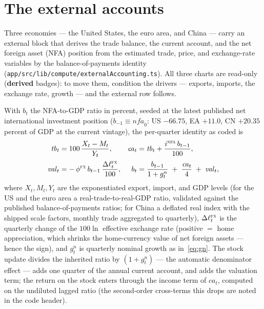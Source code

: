 \documentclass[11pt]{article}
\newcommand{\ui}[1]{\textbf{#1}}
\theoremstyle{plain}
\theoremstyle{remark}
\begin{document}
\section{The external accounts}\label{sec:external}

Three economies --- the United States, the euro area, and China ---
carry an external block that derives the trade balance, the current
account, and the net foreign asset (NFA) position from the estimated
trade, price, and exchange-rate variables by the balance-of-payments
identity (\texttt{app/src/lib/compute/externalAccounting.ts}). All
three charts are read-only (\ui{derived} badges): to move them,
condition the drivers --- exports, imports, the exchange rate, growth
--- and the external row follows.

With $b_t$ the NFA-to-GDP ratio in percent, seeded at the latest
published net international investment position ($b_{-1} \equiv
\mathit{nfa}_0$: US $-66.75$, EA $+11.0$, CN $+20.35$ percent of GDP at
the current vintage), the per-quarter identity as coded is
\begin{align}
  \mathit{tb}_t &= 100\,\frac{X_t - M_t}{Y_t},
  &\mathit{ca}_t &= \mathit{tb}_t + \frac{i^{\textsc{nfa}}\, b_{t-1}}{100},
  \label{eq:tbca}\\[2pt]
  \mathit{val}_t &= -\,\phi^{\textsc{fx}}\, b_{t-1}\,
      \frac{\Delta \ell^{\textsc{fx}}_t}{100},
  &b_t &= \frac{b_{t-1}}{1 + g^{n}_t}
      \;+\; \frac{\mathit{ca}_t}{4} \;+\; \mathit{val}_t,
  \label{eq:nfa}
\end{align}
where $X_t, M_t, Y_t$ are the exponentiated export, import, and GDP
levels (for the US and the euro area a real-trade-to-real-GDP ratio,
validated against the published balance-of-payments ratios; for China a
deflated real index with the shipped scale factors, monthly trade
aggregated to quarterly), $\Delta\ell^{\textsc{fx}}_t$ is the quarterly
change of the $100\ln$ effective exchange rate (positive $=$ home
appreciation, which shrinks the home-currency value of net foreign
assets --- hence the sign), and $g^n_t$ is quarterly nominal growth
as in~\eqref{eq:gn}. The stock update divides the inherited ratio by
$(1+g^n_t)$ --- the automatic denominator effect --- adds one quarter of
the annual current account, and adds the valuation term; the return on
the stock enters through the income term of $\mathit{ca}_t$, computed on
the undiluted lagged ratio (the second-order cross-terms this drops are
noted in the code header).
\end{document}

